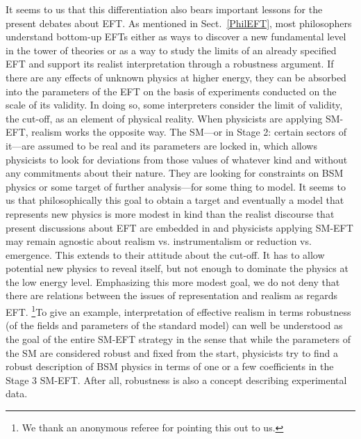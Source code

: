 It seems to us that this differentiation also bears important lessons for the present debates about EFT. 
As mentioned in Sect.~\ref{PhilEFT}, most philosophers understand bottom-up EFTs either as ways to discover a new fundamental level in the tower of theories  or as a way to study the limits of an already specified EFT and support its realist interpretation through a robustness argument. 
If there are any effects of unknown physics at higher energy, they can be absorbed into the parameters of the EFT on the basis of experiments conducted on the scale of its validity. 
In doing so, some interpreters consider the limit of validity, the cut-off, as an element of physical reality. When physicists are applying SM-EFT, realism works the opposite way. 
The SM---or in Stage 2: certain sectors of it---are assumed to be real and its parameters are locked in, which allows physicists to look for deviations from those values of whatever kind and without any commitments about their nature. 
They are looking for constraints on BSM physics or some target of further analysis---for some thing to model. 
It seems to us that philosophically this goal to obtain a target and eventually a model that represents new physics is more modest in kind than the realist discourse that present discussions about EFT are embedded in and physicists applying SM-EFT may remain agnostic about realism vs. instrumentalism or reduction vs. emergence. 
This extends to their attitude about the cut-off. It has to allow potential new physics to reveal itself, but not enough to dominate the physics at the low energy level.
Emphasizing this more modest goal, we do not deny that there are relations between the issues of representation and realism as regards EFT. \footnote{We thank an anonymous referee for pointing this out to us.}To give an example, \citep[][']{williams2018} interpretation of effective realism in terms robustness (of the fields and parameters of the standard model) can well be understood as the goal of the entire SM-EFT strategy in the sense that while the parameters of the SM are considered robust and fixed from the start, physicists try to find a robust description of BSM physics in terms of one or a few coefficients in the Stage 3 SM-EFT. After all, robustness is also a concept describing experimental data.